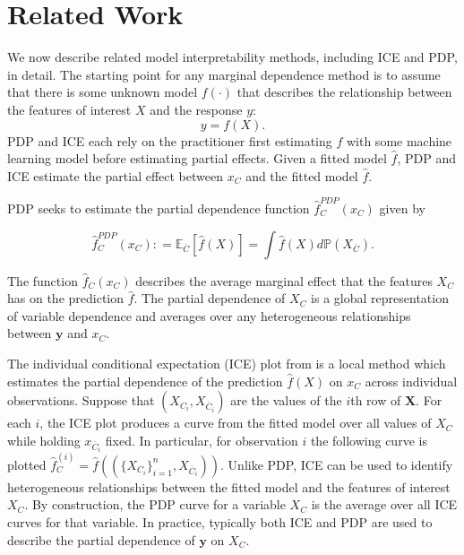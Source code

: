 \documentclass[12pt]{article}
\begin{document}
\section{Related Work}\label{sec:related}

We now describe related model interpretability methods, including ICE and PDP, in detail. The starting point for any marginal dependence method is to assume that there is some unknown model $f(\cdot)$ that describes the relationship between the features of interest $X$ and the response $y$:
\vskip -1pc
$${y} = f({X}).$$  PDP and ICE each rely on the practitioner first estimating $f$ with some machine learning model before estimating partial effects. Given a fitted model $\widehat{f}$, PDP and ICE estimate the partial effect between $x_C$ and the fitted model $\widehat{f}$. 

PDP seeks to estimate the partial dependence function $\widehat{f}^{PDP}_C(x_C)$ given by

\begin{equation*}\label{eq:PDP} \widehat{f}^{PDP}_C(x_C): = \mathbb{E}_{\overline{C}}\left[\widehat{f}({X})\right] = \int \widehat{f}({X}) d\mathbb{P}(X_{\overline{C}}).\end{equation*}


The function $\widehat{f}_C(x_C)$ describes the average marginal effect that the features $X_C$ has on the prediction $\widehat{f}$. The partial dependence of $X_C$ is a global representation of variable dependence and averages over any heterogeneous relationships between $\mathbf{y}$ and $x_C$. 

The individual conditional expectation (ICE) plot from \cite{ICE} is a local method which estimates the partial dependence of the prediction $\widehat{f}({X})$ on $x_C$ across individual observations. Suppose that $(X_{C_i}, X_{\overline{C}_i})$ are the values of the $i$th row of $\mathbf{X}$. For each $i$, the ICE plot produces a curve from the fitted model over all values of $X_C$ while holding $x_{\overline{C}_i}$ fixed. In particular, for observation $i$ the following curve is plotted $\widehat{f}^{(i)}_C = \widehat{f}((\{X_{C_i}\}_{i = 1}^n, X_{\overline{C}_i}))$. Unlike PDP, ICE can be used to  identify heterogeneous relationships between the fitted model and the features of interest $X_C$. By construction, the PDP curve for a variable $X_C$ is the average over all ICE curves for that variable. In practice, typically both ICE and PDP are used to describe the partial dependence of $\mathbf{y}$ on $X_C$.
\end{document}
